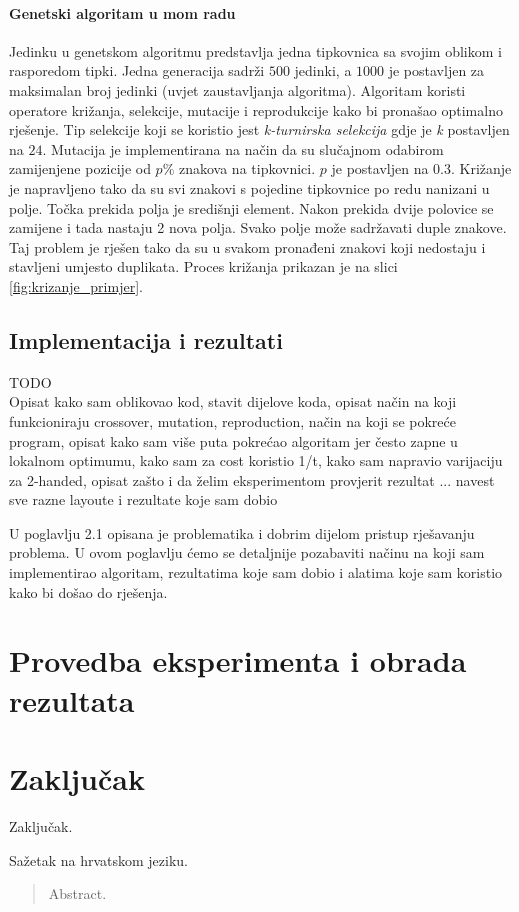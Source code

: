\documentclass[times, utf8, zavrsni]{fer}
\begin{document}
\subsubsection{Genetski algoritam u mom radu}
Jedinku u genetskom algoritmu predstavlja jedna tipkovnica sa svojim oblikom i rasporedom tipki. Jedna generacija sadrži $500$ jedinki, a $1000$ je postavljen za maksimalan broj jedinki (uvjet zaustavljanja algoritma). Algoritam koristi operatore križanja, selekcije, mutacije i reprodukcije kako bi pronašao optimalno rješenje. Tip selekcije koji se koristio jest \emph{k-turnirska selekcija} gdje je \emph{k} postavljen na $24$. Mutacija je implementirana na način da su slučajnom odabirom zamijenjene pozicije od $p\%$ znakova na tipkovnici. $p$ je postavljen na $0.3$. Križanje je napravljeno tako da su svi znakovi s pojedine tipkovnice po redu nanizani u polje. Točka prekida polja je središnji element. Nakon prekida dvije polovice se zamijene i tada nastaju 2 nova polja. Svako polje može sadržavati duple znakove. Taj problem je rješen tako da su u svakom pronađeni znakovi koji nedostaju i stavljeni umjesto duplikata. Proces križanja prikazan je na slici \ref{fig:krizanje_primjer}.

\section{Implementacija i rezultati}
TODO \\
Opisat kako sam oblikovao kod, stavit dijelove koda, opisat način na koji funkcioniraju crossover, mutation, reproduction, način na koji se pokreće program, opisat kako sam više puta pokrećao algoritam jer često zapne u lokalnom optimumu, kako sam za cost koristio 1/t, kako sam napravio varijaciju za 2-handed, opisat zašto i da želim eksperimentom provjerit rezultat ... navest sve razne layoute i rezultate koje sam dobio

U poglavlju 2.1 opisana je problematika i dobrim dijelom pristup rješavanju problema. U ovom poglavlju ćemo se detaljnije pozabaviti načinu na koji sam implementirao algoritam, rezultatima koje sam dobio i alatima koje sam koristio kako bi došao do rješenja.


\chapter{Provedba eksperimenta i obrada rezultata}

\chapter{Zaključak}
Zaključak.




\begin{sazetak}
Sažetak na hrvatskom jeziku.

\end{sazetak}

\begin{abstract}
Abstract.	

\end{abstract}
\end{document}
